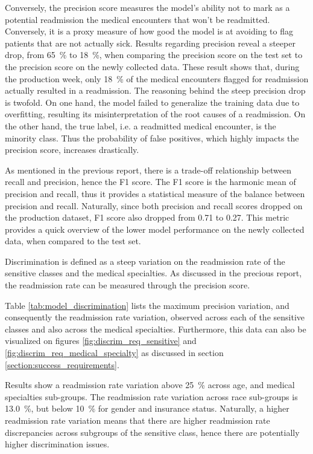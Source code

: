 \documentclass[a4paper,11pt]{article}
\begin{document}
Conversely, the precision score measures the model's ability not to mark as a potential readmission the medical encounters that won't be readmitted. Conversely, it is a proxy measure of how good the model is at avoiding to flag patients that are not actually sick.
Results regarding precision reveal a steeper drop, from \SI{65}{\percent} to \SI{18}{\percent}, when comparing the precision score on the test set to the precision score on the newly collected data.
These result shows that, during the production week, only \SI{18}{\percent} of the medical encounters flagged for readmission actually resulted in a readmission.
The reasoning behind the steep precision drop is twofold. On one hand, the model failed to generalize the training data due to overfitting, resulting its misinterpretation of the root causes of a readmission.
On the other hand, the true label, i.e. a readmitted medical encounter, is the minority class. Thus the probability of false positives, which highly impacts the precision score, increases drastically. 


As mentioned in the previous report, there is a trade-off relationship between recall and precision, hence the F1 score. The F1 score is the harmonic mean of precision and recall, thus it provides a statistical measure of the balance between precision and recall. Naturally, since both precision and recall scores dropped on the production dataset, F1 score also dropped from \SI{0.71}{} to \SI{0.27}{}. This metric provides a quick overview of the lower model performance on the newly collected data, when compared to the test set.

Discrimination is defined as a steep variation on the readmission rate of the sensitive classes and the medical specialties. As discussed in the precious report, the readmission rate can be measured through the precision score. 

Table \ref{tab:model_discrimination} lists the maximum precision variation, and consequently the readmission rate variation, observed across each of the sensitive classes and also across the medical specialties. Furthermore, this data can also be visualized on figures \ref{fig:discrim_req_sensitive} and \ref{fig:discrim_req_medical_specialty} as discussed in section \ref{section:success_requirements}.

Results show a readmission rate variation above \SI{25}{\percent} across age, and medical specialties sub-groups. The readmission rate variation across race sub-groups is \SI{13.0}{\percent}, but below \SI{10}{\percent} for gender and insurance status. Naturally, a higher readmission rate variation means that there are higher readmission rate discrepancies across subgroups of the sensitive class, hence there are potentially higher discrimination issues. 
\end{document}

